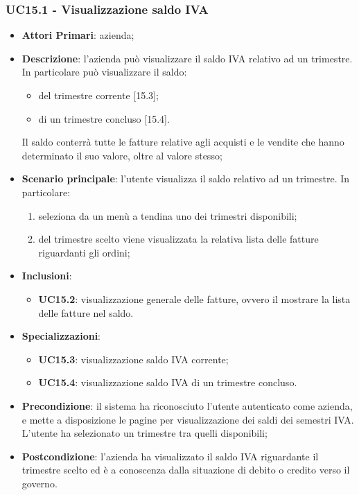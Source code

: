 \subsubsection{UC15.1 - Visualizzazione saldo IVA}
\begin{itemize}
	\item \textbf{Attori Primari}: azienda;
	\item \textbf{Descrizione}: l'azienda può visualizzare il saldo IVA relativo ad un trimestre. In particolare può visualizzare il saldo:
	\begin{itemize}
		\item del trimestre corrente [15.3];
		\item di un trimestre concluso [15.4].
	\end{itemize}
	Il saldo conterrà tutte le fatture relative agli acquisti e le vendite che hanno determinato il suo valore, oltre al valore stesso;
	\item \textbf{Scenario principale}: l'utente visualizza il saldo relativo ad un trimestre. In particolare:
	\begin{enumerate}[label=\alph*.]
		\item seleziona da un menù a tendina uno dei trimestri disponibili;
		\item del trimestre scelto viene visualizzata la relativa lista delle fatture riguardanti gli ordini;
	\end{enumerate}
	\item \textbf{Inclusioni}: 
	\begin{itemize}
		\item \textbf{UC15.2}: visualizzazione generale delle fatture, ovvero il mostrare la lista delle fatture nel saldo.
	\end{itemize}
	\item \textbf{Specializzazioni}: 
	\begin{itemize}
		\item \textbf{UC15.3}: visualizzazione saldo IVA corrente;
		\item \textbf{UC15.4}:  visualizzazione saldo IVA di un trimestre concluso.
	\end{itemize}
	\item \textbf{Precondizione}: il sistema ha riconosciuto l'utente autenticato come azienda, e mette a disposizione le pagine per visualizzazione dei saldi dei semestri IVA. L'utente ha selezionato un trimestre tra quelli disponibili;
	\item \textbf{Postcondizione}: l'azienda ha visualizzato il saldo IVA riguardante il trimestre scelto ed è a conoscenza dalla situazione di debito o credito verso il governo.
\end{itemize} 

